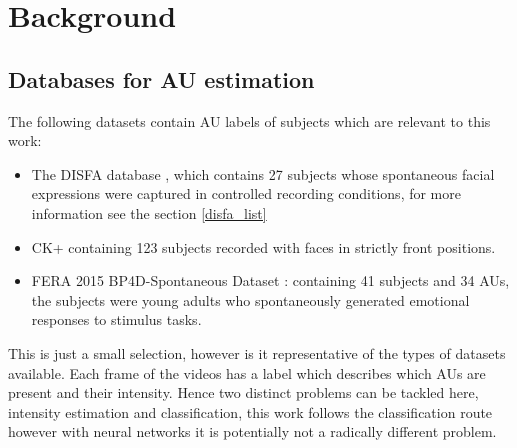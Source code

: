 \chapter{Background}

\section{Databases for AU estimation}
The following datasets contain AU labels of subjects which are relevant to this work:

\begin{itemize}
    \item The DISFA database \cite{disfa}, which contains 27 subjects whose spontaneous
          facial expressions were captured in controlled recording conditions, for more information see the section \ref{disfa_list}
    \item CK+ \cite{Lucey2010} containing 123 subjects recorded with faces in strictly front positions.
    \item FERA 2015 BP4D-Spontaneous Dataset \cite{Valstar}:
          containing 41 subjects and 34 AUs, the subjects were young adults who
          spontaneously generated emotional responses to stimulus tasks.
\end{itemize}

This is just a small selection, however is it representative of the types of
datasets available. Each frame of the videos has a label which describes which AUs are
present and their intensity. Hence two distinct problems can be tackled here, intensity
estimation and classification, this work follows the classification route however
with neural networks it is potentially not a radically different problem.







